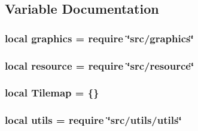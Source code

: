 \subsection{Variable Documentation}
\hypertarget{tilemap_8lua_aae06ace8bee01f93d02dfaa4436de916}{
\subsubsection[{graphics}]{\setlength{\rightskip}{0pt plus 5cm}local graphics = require \char`\"{}src/graphics\char`\"{}}}\label{tilemap_8lua_aae06ace8bee01f93d02dfaa4436de916}
\hypertarget{tilemap_8lua_a24ad487107aaa56bef35825abbe9773d}{
\subsubsection[{resource}]{\setlength{\rightskip}{0pt plus 5cm}local resource = require \char`\"{}src/resource\char`\"{}}}\label{tilemap_8lua_a24ad487107aaa56bef35825abbe9773d}
\hypertarget{tilemap_8lua_ac9e355a21406160a79936e89b3ef12ca}{
\subsubsection[{Tilemap}]{\setlength{\rightskip}{0pt plus 5cm}local Tilemap = \{\}}}\label{tilemap_8lua_ac9e355a21406160a79936e89b3ef12ca}
\hypertarget{tilemap_8lua_a9b2ba82def3d3656dc370bac0a641700}{
\subsubsection[{utils}]{\setlength{\rightskip}{0pt plus 5cm}local utils = require \char`\"{}src/utils/utils\char`\"{}}}\label{tilemap_8lua_a9b2ba82def3d3656dc370bac0a641700}
